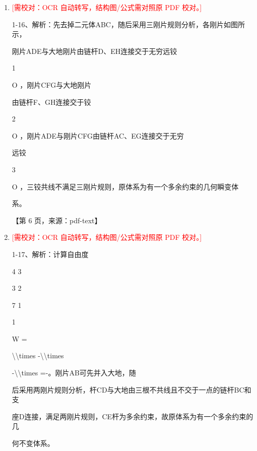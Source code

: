 \documentclass[UTF8,12pt,a4paper,openany]{ctexbook}
\newcommand{\TODO}[1]{\textcolor{red}{[需校对：#1]}}
\begin{document}
\begin{enumerate}[label=\textbf{\arabic*.},leftmargin=2em]
\item \TODO{OCR 自动转写，结构图/公式需对照原 PDF 校对。}\par 1-16、解析：先去掉二元体ABC，随后采用三刚片规则分析，各刚片如图所示，\par 刚片ADE与大地刚片由链杆D、EH连接交于无穷远铰\par 1\par O ，刚片CFG与大地刚片\par 由链杆F、GH连接交于铰\par 2\par O ，刚片ADE与刚片CFG由链杆AC、EG连接交于无穷\par 远铰\par 3\par O ，三铰共线不满足三刚片规则，原体系为有一个多余约束的几何瞬变体\par 系。\par \par 【第 6 页，来源：pdf-text】
\item \TODO{OCR 自动转写，结构图/公式需对照原 PDF 校对。}\par 1-17、解析：计算自由度\par 4 3\par 3 2\par 7 1\par 1\par W =\par \textbackslash{}\textbackslash{}times -\textbackslash{}\textbackslash{}times\par -\textbackslash{}\textbackslash{}times =-。刚片AB可先并入大地，随\par 后采用两刚片规则分析，杆CD与大地由三根不共线且不交于一点的链杆BC和支\par 座D连接，满足两刚片规则，CE杆为多余约束，故原体系为有一个多余约束的几\par 何不变体系。
\end{enumerate}
\end{document}

